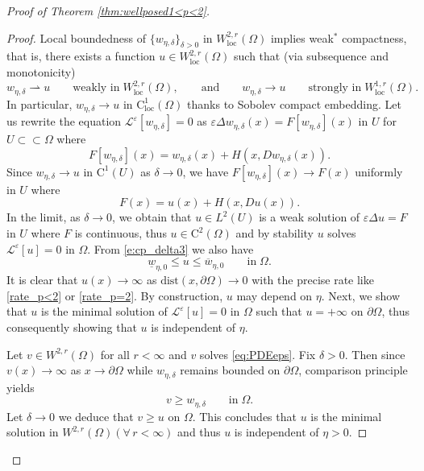 \documentclass[11pt,reqno]{amsart}
\numberwithin{figure}{section}
\theoremstyle{plain}
\theoremstyle{remark}
\numberwithin{equation}{section}
\newcommand{\rup}{\rightharpoonup}
\begin{document}
\begin{appendices}
\begin{proof} [Proof of Theorem \ref{thm:wellposed1<p<2}]
\begin{proof}
    \noindent Local boundedness of $\{w_{\eta,\delta}\}_{\delta>0}$ in $W^{2,r}_{\mathrm{loc}}(\Omega)$ implies weak$^*$ compactness, that is, there exists a function $u\in W^{2,r}_{\mathrm{loc}}(\Omega)$ such that (via subsequence and monotonicity)
    \begin{equation*}
        w_{\eta,\delta} \rup u \qquad\text{weakly in}\;W^{2,r}_{\mathrm{loc}}(\Omega),\qquad \text{and}\qquad
        w_{\eta,\delta} \to u \qquad\text{strongly in}\;W^{1,r}_{\mathrm{loc}}(\Omega).
    \end{equation*}
    In particular, $w_{\eta,\delta}\to u$ in $\mathrm{C}^1_{\mathrm{loc}}(\Omega)$ thanks to Sobolev compact embedding. Let us rewrite the equation $\mathcal{L}^\varepsilon\left[w_{\eta,\delta}\right] = 0$ as $\varepsilon\Delta w_{\eta,\delta}(x) = F[w_{\eta,\delta}](x)$ in $U$ for $U\subset\subset \Omega$ where
    \begin{equation*}
        F[w_{\eta,\delta}](x) =    w_{\eta,\delta}(x) + H(x,Dw_{\eta,\delta}(x)).
    \end{equation*}
    Since $w_{\eta,\delta}\to u$ in $\mathrm{C}^1(U)$ as $\delta\to 0$, we have $F[w_{\eta,\delta}](x) \to F(x)$ uniformly in $U$ where 
    \begin{equation*}
        F(x) =   u(x) + H(x,Du(x)).
    \end{equation*}
    In the limit, as $\delta\to 0$, we obtain that $u\in L^2(U)$ is a weak solution of $\varepsilon\Delta u = F$ in $U$ where $F$ is continuous, thus $u\in \mathrm{C}^2(\Omega)$ and by stability $u$ solves $\mathcal{L}^\varepsilon[u] = 0$ in $\Omega$. From \eqref{e:cp_delta3} we also have
    \begin{equation*}
        \underline{w}_{\eta,0} \leq u \leq \overline{w}_{\eta,0} \qquad\text{in}\;\Omega.
    \end{equation*}
    It is clear that $u(x)\to \infty$ as $\mathrm{dist}(x,\partial\Omega)\to 0$ with the precise rate like \eqref{rate_p<2} or \eqref{rate_p=2}. By construction, $u$ may depend on $\eta$. Next, we show that $u$ is the minimal solution of $\mathcal{L}^\varepsilon[u] = 0$ in $\Omega$ such that $u = +\infty$ on $\partial\Omega$, thus consequently showing that $u$ is independent of $\eta$.
    
    \noindent Let $v\in W^{2,r}(\Omega)$ for all $r<\infty$ and $v$ solves \eqref{eq:PDEeps}. Fix $\delta>0$. Then since $v(x)\to \infty$ as $x\to \partial\Omega$ while $w_{\eta,\delta}$ remains bounded on $\partial \Omega$, comparison principle yields
    \begin{equation*}
        v\geq w_{\eta,\delta} \qquad\text{in} \; \Omega.
    \end{equation*}
    Let $\delta\to 0$ we deduce that $v\geq u$ on $\Omega$. This concludes that $u$ is the minimal solution in $W^{2,r}(\Omega)(\forall\,r<\infty)$ and thus $u$ is independent of $\eta>0$. 
\end{proof}



\end{proof}
\end{appendices}
\end{document}
